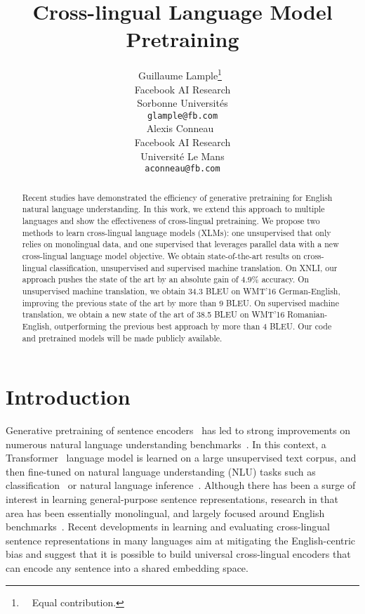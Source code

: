 \documentclass[11pt,a4paper]{article}
\title{Cross-lingual Language Model Pretraining}
\author{Guillaume Lample\thanks{\ \ Equal contribution.}~ \\
  Facebook AI Research \\
  Sorbonne Universit\'es \\
  {\tt glample@fb.com} \\\And
  Alexis Conneau\footnotemark[1]~ \\
  Facebook AI Research \\
  Universit\'e Le Mans \\
  {\tt aconneau@fb.com} \\}
\date{}
\begin{document}
\maketitle
\begin{abstract}

Recent studies have demonstrated the efficiency of generative pretraining for English natural language understanding. In this work, we extend this approach to multiple languages and show the effectiveness of cross-lingual pretraining. We propose two methods to learn cross-lingual language models (XLMs): one unsupervised that only relies on monolingual data, and one supervised that leverages parallel data with a new cross-lingual language model objective. We obtain state-of-the-art results on cross-lingual classification, unsupervised and supervised machine translation. On XNLI, our approach pushes the state of the art by an absolute gain of 4.9\% accuracy. On unsupervised machine translation, we obtain 34.3 BLEU on WMT'16 German-English, improving the previous state of the art by more than 9 BLEU. On supervised machine translation, we obtain a new state of the art of 38.5 BLEU on WMT'16 Romanian-English, outperforming the previous best approach by more than 4 BLEU. Our code and pretrained models will be made publicly available.



\end{abstract}


\section{Introduction}
\label{sect:intro}

Generative pretraining of sentence encoders~\cite{radford2018improving,howard2018universal,devlin2018bert} has led to strong improvements on numerous natural language understanding benchmarks~\cite{wang2018glue}. In this context, a Transformer~\cite{transformer17} language model is learned on a large unsupervised text corpus, and then fine-tuned on natural language understanding (NLU) tasks such as classification~\cite{socher2013recursive} or natural language inference~\cite{bowman2015large,multinli:2017}. Although there has been a surge of interest in learning general-purpose sentence representations, research in that area has been essentially monolingual, and largely focused around English benchmarks~\cite{conneau2018senteval, wang2018glue}. Recent developments in learning and evaluating cross-lingual sentence representations in many languages \cite{conneau2018xnli} aim at mitigating the English-centric bias and suggest that it is possible to build universal cross-lingual encoders that can encode any sentence into a shared embedding space.
\end{document}
